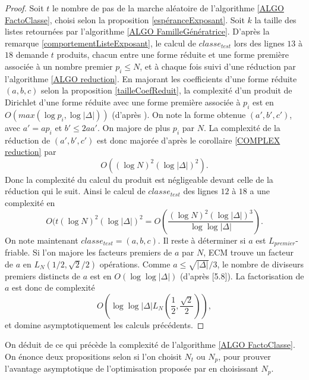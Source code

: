 \begin{proof}
	Soit $t$ le nombre de pas de la marche aléatoire de l'algorithme \ref{ALGO FactoClasse}, choisi selon la proposition \ref{espéranceExposant}. Soit $k$ la taille des listes retournées par l'algorithme \ref{ALGO FamilleGénératrice}. D'après la remarque \ref{comportementListeExposant}, le calcul de $classe_{test}$ lors des lignes $13$ à $18$ demande $t$ produits, chacun entre une forme réduite et une forme première associée à un nombre premier $p_{i} \leq N$, et à chaque fois suivi d'une réduction par l'algorithme \ref{ALGO reduction}. En majorant les coefficients d'une forme réduite $(a,b,c)$ selon la proposition \ref{tailleCoefReduit},
	la complexité d'un produit de Dirichlet d'une forme réduite avec une forme première associée à $p_{i}$ est en $O(max(\log p_{i},\log|\Delta|))$ (d'après \cite{JaoSoukharev}). On note la forme obtenue $(a',b',c')$, avec $a' = ap_{i}$ et $b'\leq 2aa'$. On majore de plus $p_{i}$ par $N$. La complexité de la réduction de $(a',b',c')$ est donc majorée d'après le corollaire \ref{COMPLEX reduction} par 
	\begin{equation*}
		 O((\log N)^2(\log|\Delta|)^2).
	\end{equation*}
	Donc la complexité du calcul du produit est négligeable devant celle de la réduction qui le suit. Ainsi le calcul de $classe_{test}$ des lignes $12$ à $18$ a une complexité en
	\begin{equation*}
		O(t(\log N)^2(\log|\Delta|)^2 = O\left( \frac{(\log N)^2(\log|\Delta|)^3}{\log\log|\Delta|}\right).
	\end{equation*}
	 On note maintenant $classe_{test} = (a,b,c)$. Il reste à déterminer si $a$ est $L_{premier}$-friable. Si l'on majore les facteurs premiers de $a$ par $N$, ECM trouve un facteur de $a$ en $L_{N}(1/2,\sqrt{2}/2)$ opérations. Comme $a \leq \sqrt{|\Delta|}/3$, le nombre de diviseurs premiers distincts de $a$ est en $O(\log\log|\Delta|)$ (d'après \cite{Riesel1985}[5.8]). La factorisation de $a$ est donc de complexité
	\begin{equation*}
		O\left( \log\log|\Delta|L_{N}\left( \frac{1}{2},\frac{\sqrt{2}}{2}\right) \right), 
	\end{equation*}
	et domine asymptotiquement les calculs précédents. 
\end{proof}

On déduit de ce qui précède la complexité de l'algorithme \ref{ALGO FactoClasse}. On énonce deux propositions selon si l'on choisit $N_t$ ou $N_p$, pour prouver l'avantage asymptotique de l'optimisation proposée par \cite{JaoSoukharev} en choisissant $N_p$. 

